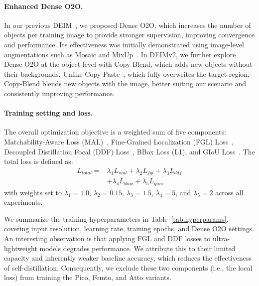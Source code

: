 \paragraph{Enhanced Dense O2O.}
In our previous DEIM~\cite{huang2025deim}, we proposed Dense O2O, which increases the number of objects per training image to provide stronger supervision, improving convergence and performance. Its effectiveness was initially demonstrated using image-level augmentations such as Mosaic and MixUp~\cite{zhang2017mixup}. In DEIMv2, we further explore Dense O2O at the object level with Copy-Blend, which adds new objects without their backgrounds. Unlike Copy-Paste~\cite{ghiasi2021simple}, which fully overwrites the target region, Copy-Blend blends new objects with the image, better suiting our scenario and consistently improving performance.

\paragraph{Training setting and loss.} The overall optimization objective is a weighted sum of five components: Matchability-Aware Loss (MAL)~\cite{huang2025deim}, Fine-Grained Localization (FGL) Loss~\cite{peng2024d}, Decoupled Distillation Focal (DDF) Loss~\cite{peng2024d}, BBox Loss (L1), and GIoU Loss~\cite{rezatofighi2019generalized}. The total loss is defined as:
\begin{equation}
    \begin{aligned}
    L_{total} = & \lambda_1 L_{mal} + \lambda_2 L_{fgl} + \lambda_3 L_{ddf} \\
    & + \lambda_4 L_{bbox} + \lambda_5 L_{giou}
    \end{aligned}
\end{equation}
with weights set to $\lambda_1 = 1.0$, $\lambda_2 = 0.15$, $\lambda_3 = 1.5$, $\lambda_4 = 5$, and $\lambda_5 = 2$ across all experiments. 

We summarize the training hyperparameters in Table~\ref{tab:hyperparams}, covering input resolution, learning rate, training epochs, and Dense O2O settings. An interesting observation is that applying FGL and DDF losses to ultra-lightweight models degrades performance. We attribute this to their limited capacity and inherently weaker baseline accuracy, which reduces the effectiveness of self-distillation. Consequently, we exclude these two components (i.e., the local loss) from training the Pico, Femto, and Atto variants.

